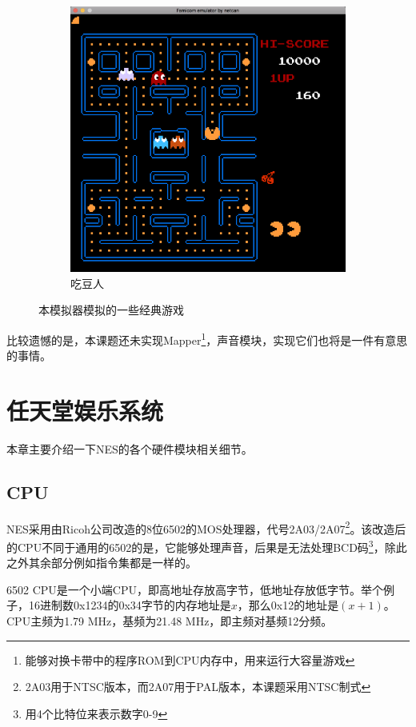 \documentclass[a4paper]{ltxdoc}
\begin{document}
{\begin{figure}[h]
\begin{subfigure}[b]{0.45\textwidth}
			\includegraphics[width=\textwidth]{images/pac_man.png}
			\caption{吃豆人}
		\end{subfigure}
		\caption{本模拟器模拟的一些经典游戏}
		\label{fig:goal}
\end{figure}

比较遗憾的是，本课题还未实现Mapper\footnote{能够对换卡带中的程序ROM到CPU内存中，用来运行大容量游戏}，声音模块，实现它们也将是一件有意思的事情。

\section{任天堂娱乐系统}
本章主要介绍一下NES的各个硬件模块相关细节。

\subsection{CPU}
NES采用由Ricoh公司改造的8位6502的MOS处理器，代号2A03/2A07\footnote{2A03用于NTSC版本，而2A07用于PAL版本，本课题采用NTSC制式}。该改造后的CPU不同于通用的6502的是，它能够处理声音，后果是无法处理BCD码\footnote{用4个比特位来表示数字0-9}，除此之外其余部分例如指令集都是一样的。

6502 CPU是一个小端CPU，即高地址存放高字节，低地址存放低字节。举个例子，16进制数0x1234的0x34字节的内存地址是$x$，那么0x12的地址是$(x+1)$。CPU主频为1.79 MHz，基频为21.48 MHz，即主频对基频12分频。

}
\end{document}

